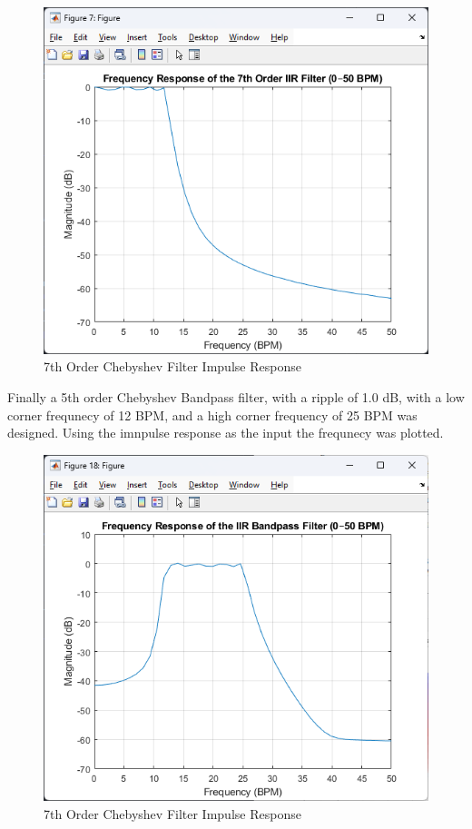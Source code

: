 \documentclass[journal]{IEEEtran}
\begin{document}
\begin{figure}[H]
    \centering
    \includegraphics[width=\linewidth]{7thOrderIIRFrequency.png}
    \caption{7th Order Chebyshev Filter Impulse Response}
    \label{fig:7th_cheby_high_freq}
\end{figure}

Finally a 5th order Chebyshev Bandpass filter, with a ripple of 1.0 dB, with a low corner frequnecy of 12 BPM, and a high corner frequency of 25 BPM was designed. Using the imnpulse response as the input the frequnecy was plotted.

\begin{figure}[H]
    \centering
    \includegraphics[width=\linewidth]{BandpassSOSFrequency.png}
    \caption{7th Order Chebyshev Filter Impulse Response}
    \label{fig:5th_cheby_band_freq}
\end{figure}
\end{document}
